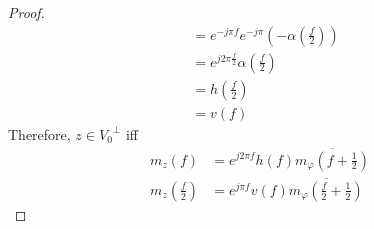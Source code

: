 \documentclass[titlepage, fleqn, a4paper, 12pt, twoside]{article}
\theoremstyle{definition}
\theoremstyle{theorem}
\begin{document}
\begin{proof}
\begin{align*}
		&= e^{-j \pi f} e^{-j \pi} \left( -\alpha\left( \frac{f}{2} \right) \right)\\
		&= e^{j 2 \pi \frac{f}{2}} \alpha\left( \frac{f}{2} \right)\\
		&= h\left( \frac{f}{2} \right)\\
		&= v(f)
	\end{align*}
	Therefore, $z \in {V_0}^{\perp}$ iff
	\begin{align*}
		m_z(f) &= e^{j 2 \pi f} h(f) \overline{m_{\varphi}\left( f + \frac{1}{2} \right)}\\
		m_z\left( \frac{f}{2} \right) &= e^{j \pi f} v(f) \overline{m_{\varphi}\left( \frac{f}{2} + \frac{1}{2} \right)}
	\end{align*}
\end{proof}

\clearpage
\printindex
\end{document}
